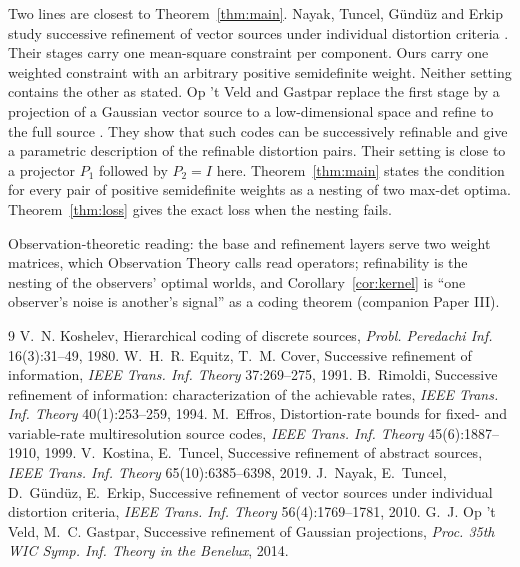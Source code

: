 \documentclass[11pt]{article}
\begin{document}
Two lines are closest to Theorem~\ref{thm:main}. Nayak, Tuncel, G\"und\"uz and
Erkip study successive refinement of vector sources under individual distortion
criteria \cite{nayak2010}. Their stages carry one mean-square constraint per
component. Ours carry one weighted constraint with an arbitrary positive
semidefinite weight. Neither setting contains the other as stated. Op 't Veld
and Gastpar replace the first stage by a projection of a Gaussian vector source
to a low-dimensional space and refine to the full source \cite{opveld2014}.
They show that such codes can be successively refinable and give a parametric
description of the refinable distortion pairs. Their setting is close to a
projector $P_1$ followed by $P_2=I$ here. Theorem~\ref{thm:main} states the
condition for every pair of positive semidefinite weights as a nesting of two
max-det optima. Theorem~\ref{thm:loss} gives the exact loss when the nesting
fails.

Observation-theoretic reading: the base and refinement layers serve two
weight matrices, which Observation Theory calls read operators; refinability
is the nesting of the observers' optimal
worlds, and Corollary~\ref{cor:kernel} is ``one observer's noise is
another's signal'' as a coding theorem (companion Paper III).

\begin{thebibliography}{9}
 V.~N. Koshelev, Hierarchical coding of discrete sources,
\emph{Probl. Peredachi Inf.} 16(3):31--49, 1980.
 W.~H.~R. Equitz, T.~M. Cover, Successive refinement of
information, \emph{IEEE Trans. Inf. Theory} 37:269--275, 1991.
 B.~Rimoldi, Successive refinement of information:
characterization of the achievable rates, \emph{IEEE Trans. Inf. Theory}
40(1):253--259, 1994.
 M.~Effros, Distortion-rate bounds for fixed- and
variable-rate multiresolution source codes, \emph{IEEE Trans. Inf. Theory}
45(6):1887--1910, 1999.
 V.~Kostina, E.~Tuncel, Successive refinement of
abstract sources, \emph{IEEE Trans. Inf. Theory} 65(10):6385--6398, 2019.
 J.~Nayak, E.~Tuncel, D.~G\"und\"uz, E.~Erkip, Successive
refinement of vector sources under individual distortion criteria,
\emph{IEEE Trans. Inf. Theory} 56(4):1769--1781, 2010.
 G.~J. Op 't Veld, M.~C. Gastpar, Successive refinement of
Gaussian projections, \emph{Proc. 35th WIC Symp. Inf. Theory in the Benelux},
2014.
\end{thebibliography}
\end{document}

